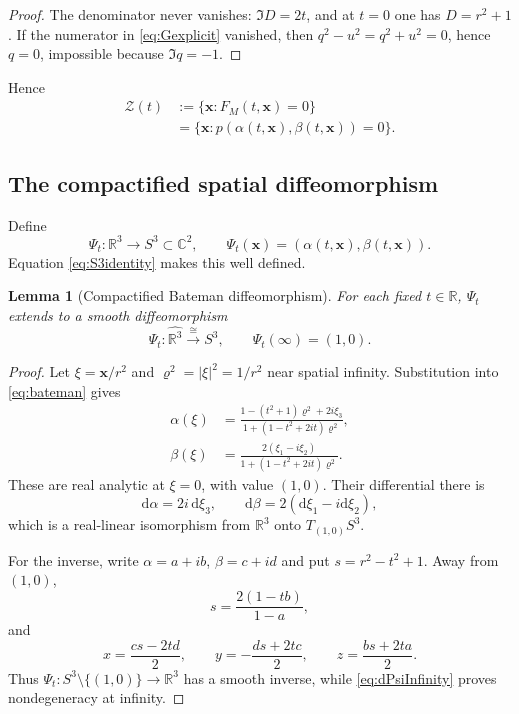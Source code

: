 \documentclass[aps,prd,reprint,nofootinbib,superscriptaddress]{revtex4-2}
\newtheorem{lemma}[theorem]{Lemma}
\theoremstyle{definition}
\theoremstyle{remark}
\newcommand{\R}{\mathbb{R}}
\newcommand{\C}{\mathbb{C}}
\newcommand{\cZ}{\mathcal{Z}}
\newcommand{\dd}{\mathrm{d}}
\begin{document}
\begin{proof}
The denominator never vanishes: $\Im D=2t$, and at $t=0$ one has $D=r^2+1$. If the numerator in \eqref{eq:Gexplicit} vanished, then $q^2-u^2=q^2+u^2=0$, hence $q=0$, impossible because $\Im q=-1$.
\end{proof}

Hence
\begin{align}
\cZ(t)&:=\{\mathbf x:F_M(t,\mathbf x)=0\}\nonumber\\
&=\{\mathbf x:p(\alpha(t,\mathbf x),\beta(t,\mathbf x))=0\}.
\label{eq:zeroequiv}
\end{align}

\subsection{The compactified spatial diffeomorphism}

Define
\begin{equation}
\Psi_t:\R^3\longrightarrow S^3\subset\C^2,
\qquad
\Psi_t(\mathbf x)=(\alpha(t,\mathbf x),\beta(t,\mathbf x)).
\label{eq:Psi}
\end{equation}
Equation \eqref{eq:S3identity} makes this well defined.

\begin{lemma}[Compactified Bateman diffeomorphism]
\label{lem:Psidiff}
For each fixed $t\in\R$, $\Psi_t$ extends to a smooth diffeomorphism
\begin{equation}
\Psi_t:\widehat{\R^3}\xrightarrow{\cong}S^3,
\qquad
\Psi_t(\infty)=(1,0).
\label{eq:Psicompact}
\end{equation}
\end{lemma}

\begin{proof}
Let $\xi=\mathbf x/r^2$ and $\varrho^2=|\xi|^2=1/r^2$ near spatial infinity. Substitution into \eqref{eq:bateman} gives
\begin{align}
\alpha(\xi)
&=\frac{1-(t^2+1)\varrho^2+2i\xi_3}
{1+(1-t^2+2it)\varrho^2},\\
\beta(\xi)
&=\frac{2(\xi_1-i\xi_2)}
{1+(1-t^2+2it)\varrho^2}.
\label{eq:inversion}
\end{align}
These are real analytic at $\xi=0$, with value $(1,0)$. Their differential there is
\begin{equation}
\dd\alpha=2i\,\dd\xi_3,
\qquad
\dd\beta=2(\dd\xi_1-i\dd\xi_2),
\label{eq:dPsiInfinity}
\end{equation}
which is a real-linear isomorphism from $\R^3$ onto $T_{(1,0)}S^3$.

For the inverse, write $\alpha=a+ib$, $\beta=c+id$ and put $s=r^2-t^2+1$. Away from $(1,0)$,
\begin{equation}
s=\frac{2(1-tb)}{1-a},
\label{eq:sInverse}
\end{equation}
and
\begin{equation}
x=\frac{cs-2td}{2},
\qquad
y=-\frac{ds+2tc}{2},
\qquad
z=\frac{bs+2ta}{2}.
\label{eq:PsiInverse}
\end{equation}
Thus $\Psi_t:S^3\setminus\{(1,0)\}\to\R^3$ has a smooth inverse, while \eqref{eq:dPsiInfinity} proves nondegeneracy at infinity.
\end{proof}
\end{document}
